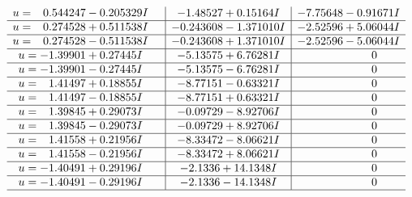 \documentclass[1p]{elsarticle_modified}
\theoremstyle{definition}
\begin{document}
$$\begin{array}{c|c|c}
\begin{aligned}
u &= \phantom{-}0.544247 - 0.205329 I\end{aligned}
 & -1.48527 + 0.15164 I & -7.75648 - 0.91671 I \\ \hline\begin{aligned}
u &= \phantom{-}0.274528 + 0.511538 I\end{aligned}
 & -0.243608 - 1.371010 I & -2.52596 + 5.06044 I \\ \hline\begin{aligned}
u &= \phantom{-}0.274528 - 0.511538 I\end{aligned}
 & -0.243608 + 1.371010 I & -2.52596 - 5.06044 I \\ \hline\begin{aligned}
u &= -1.39901 + 0.27445 I\end{aligned}
 & -5.13575 + 6.76281 I & \phantom{-0.000000 } 0 \\ \hline\begin{aligned}
u &= -1.39901 - 0.27445 I\end{aligned}
 & -5.13575 - 6.76281 I & \phantom{-0.000000 } 0 \\ \hline\begin{aligned}
u &= \phantom{-}1.41497 + 0.18855 I\end{aligned}
 & -8.77151 - 0.63321 I & \phantom{-0.000000 } 0 \\ \hline\begin{aligned}
u &= \phantom{-}1.41497 - 0.18855 I\end{aligned}
 & -8.77151 + 0.63321 I & \phantom{-0.000000 } 0 \\ \hline\begin{aligned}
u &= \phantom{-}1.39845 + 0.29073 I\end{aligned}
 & -0.09729 - 8.92706 I & \phantom{-0.000000 } 0 \\ \hline\begin{aligned}
u &= \phantom{-}1.39845 - 0.29073 I\end{aligned}
 & -0.09729 + 8.92706 I & \phantom{-0.000000 } 0 \\ \hline\begin{aligned}
u &= \phantom{-}1.41558 + 0.21956 I\end{aligned}
 & -8.33472 - 8.06621 I & \phantom{-0.000000 } 0 \\ \hline\begin{aligned}
u &= \phantom{-}1.41558 - 0.21956 I\end{aligned}
 & -8.33472 + 8.06621 I & \phantom{-0.000000 } 0 \\ \hline\begin{aligned}
u &= -1.40491 + 0.29196 I\end{aligned}
 & -2.1336 + 14.1348 I & \phantom{-0.000000 } 0 \\ \hline\begin{aligned}
u &= -1.40491 - 0.29196 I\end{aligned}
 & -2.1336 - 14.1348 I & \phantom{-0.000000 } 0\\
 \hline 
 \end{array}$$\newpage\newpage\renewcommand{\arraystretch}{1}
\end{document}
